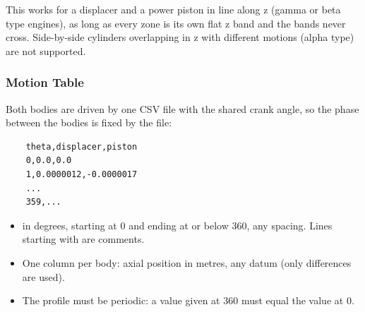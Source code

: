 This works for a displacer and a power piston in line along z (gamma or beta type engines), as long as every zone is its own flat z band and the bands never cross. Side-by-side cylinders overlapping in z with different motions (alpha type) are not supported.

\subsubsection{Motion Table}
Both bodies are driven by one CSV file with the shared crank angle, so the phase between the bodies is fixed by the file:
\begin{lstlisting}
    theta,displacer,piston
    0,0.0,0.0
    1,0.0000012,-0.0000017
    ...
    359,...
\end{lstlisting}
\begin{itemize}
    \item {} in degrees, starting at 0 and ending at or below 360, any spacing. Lines starting with \codeword{#} are comments.
    \item One column per body: axial position in metres, any datum (only differences are used).
    \item The profile must be periodic: a value given at 360 must equal the value at 0.
\end{itemize}

